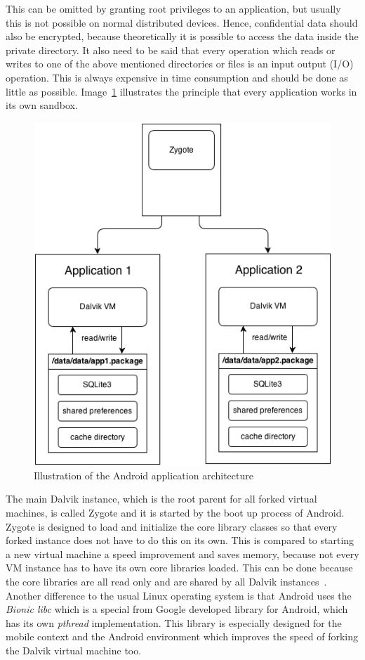 This can be omitted by granting root privileges to an application, but usually this is not possible on normal distributed devices.
Hence, confidential data should also be encrypted, because theoretically it is possible to access the data inside the private directory.
It also need to be said that every operation which reads or writes to one of the above mentioned directories or files is an input output (I/O) operation.
This is always expensive in time consumption and should be done as little as possible.
Image~\ref{fig:zygote-and-app} illustrates the principle that every application works in its own sandbox.\\
\begin{figure}[h]
\begin{center}
\includegraphics[scale=0.75]{images/zygote-and-app.png} 
\caption{Illustration of the Android application architecture}
\label{fig:zygote-and-app}
\end{center}
\end{figure}

The main Dalvik instance, which is the root parent for all forked virtual machines, is called Zygote and it is started by the boot up process of Android.
Zygote is designed to load and initialize the core library classes so that every forked instance does not have to do this on its own.
This is compared to starting a new virtual machine a speed improvement and saves memory, because not every VM instance has to have its own core libraries loaded.
This can be done because the core libraries are all read only and are shared by all Dalvik instances~\cite{ehringer2010dalvik}.
Another difference to the usual Linux operating system is that Android uses the \textit{Bionic libc} which is a special from Google developed library for Android, which has its own \textit{pthread} implementation.
This library is especially designed for the mobile context and the Android environment which improves the speed of forking the Dalvik virtual machine too.~\cite{brady2008android}

